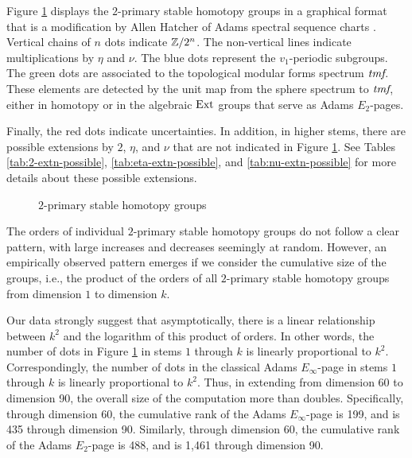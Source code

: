 Figure \ref{fig:Hatcher} displays the $2$-primary stable homotopy groups 
in a graphical format that is
a modification by Allen Hatcher of Adams spectral sequence charts
\cite{Hatcher}.
Vertical chains of $n$ dots 
indicate $\mathbb{Z}/2^n$.  The non-vertical
lines indicate multiplications by $\eta$ and $\nu$.  
The blue dots represent the $v_1$-periodic subgroups.
The green dots are associated to the topological modular forms
spectrum $\textit{tmf}$.  These elements are detected by
the unit map from the sphere spectrum to $\textit{tmf}$, either in homotopy
or in the algebraic $\operatorname{Ext}$ groups that serve as Adams $E_2$-pages.

Finally, the red dots indicate uncertainties.  In addition, in higher
stems, there are possible extensions by $2$, $\eta$, and $\nu$
that are not indicated in Figure \ref{fig:Hatcher}.
See Tables \ref{tab:2-extn-possible}, \ref{tab:eta-extn-possible},
and \ref{tab:nu-extn-possible} for more details about these possible
extensions.



\begin{figure}[htbp!]

\caption{$2$-primary stable homotopy groups
\label{fig:Hatcher}}



\end{figure}

\begin{center}

\end{center}

\begin{center}

\end{center}

The orders of individual $2$-primary stable homotopy groups do not 
follow a clear pattern, with large increases and decreases seemingly
at random.  However, an empirically observed pattern emerges
if we consider the cumulative size of the groups, i.e., the product
of the orders of 
all $2$-primary stable homotopy groups from dimension $1$ to
dimension $k$.  

Our data strongly suggest that asymptotically, there is a linear relationship between $k^2$ 
and the logarithm of this product of orders.
In other words, the number of dots in Figure \ref{fig:Hatcher} in
stems $1$ through $k$ is linearly proportional to $k^2$.
Correspondingly,
the number of dots in the classical Adams $E_\infty$-page in
stems $1$ through $k$ is linearly proportional to $k^2$.
Thus, in extending from dimension 60 to dimension 90, the overall 
size of the computation more than doubles.
Specifically, through dimension 60, the cumulative rank of the Adams $E_\infty$-page is 199, and is 435 through
dimension 90.  Similarly, through dimension 60, the cumulative
rank of the Adams $E_2$-page is 488, and is 1,461 through dimension 90.

